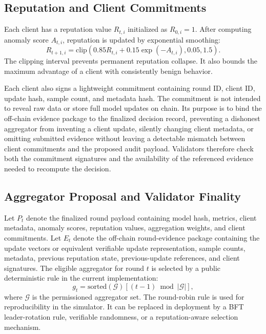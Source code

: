 \documentclass[preprint,12pt]{elsarticle}
\begin{document}
\subsection{Reputation and Client Commitments}

Each client has a reputation value $R_{t,i}$ initialized as $R_{0,i}=1$. After computing anomaly score $A_{t,i}$, reputation is updated by exponential smoothing:
\begin{equation}
R_{t+1,i}=\mathrm{clip}\left(0.85R_{t,i}+0.15\exp(-A_{t,i}),0.05,1.5\right).
\end{equation}
The clipping interval prevents permanent reputation collapse. It also bounds the maximum advantage of a client with consistently benign behavior.

Each client also signs a lightweight commitment containing round ID, client ID, update hash, sample count, and metadata hash. The commitment is not intended to reveal raw data or store full model updates on chain. Its purpose is to bind the off-chain evidence package to the finalized decision record, preventing a dishonest aggregator from inventing a client update, silently changing client metadata, or omitting submitted evidence without leaving a detectable mismatch between client commitments and the proposed audit payload. Validators therefore check both the commitment signatures and the availability of the referenced evidence needed to recompute the decision.

\subsection{Aggregator Proposal and Validator Finality}

Let $P_t$ denote the finalized round payload containing model hash, metrics, client metadata, anomaly scores, reputation values, aggregation weights, and client commitments. Let $E_t$ denote the off-chain round-evidence package containing the update vectors or equivalent verifiable update representation, sample counts, metadata, previous reputation state, previous-update references, and client signatures. The eligible aggregator for round $t$ is selected by a public deterministic rule in the current implementation:
\begin{equation}
g_t=\mathrm{sorted}(\mathcal{G})[(t-1)\bmod |\mathcal{G}|],
\end{equation}
where $\mathcal{G}$ is the permissioned aggregator set. The round-robin rule is used for reproducibility in the simulator. It can be replaced in deployment by a BFT leader-rotation rule, verifiable randomness, or a reputation-aware selection mechanism.
\end{document}
